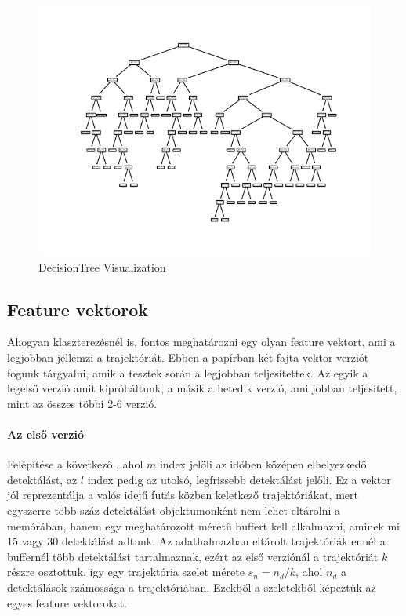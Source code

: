 \documentclass[acmtog, authorversion]{acmart}
\begin{document}
\begin{figure}
    \includegraphics[width=1\columnwidth]{visualization/bellevue_eastgate_DT_2.png}
    \caption{DecisionTree Visualization}
    \label{DTVis}
\end{figure}

\subsection{Feature vektorok}
Ahogyan klaszterezésnél is, fontos meghatározni egy olyan feature vektort, ami a legjobban jellemzi a trajektóriát. Ebben a papírban
két fajta vektor verziót fogunk tárgyalni, amik a tesztek során a legjobban teljesítettek. Az egyik a legelső verzió amit kipróbáltunk,
a másik a hetedik verzió, ami jobban teljesített, mint az összes többi 2-6 verzió. 
\paragraph{Az első verzió} Felépítése a következő \begin{math}[x_0, y_0, v_{x_0}, v_{y_0}, x_m, y_m, x_l, y_l, v_{x_l}, v_{y_l}]\end{math}, ahol \begin{math}m\end{math}
index jelöli az időben középen elhelyezkedő detektálást, az \begin{math}l\end{math} index pedig az utolsó, legfrissebb detektálást jelőli.
Ez a vektor jól reprezentálja a valós idejű futás közben keletkező trajektóriákat, mert egyszerre több száz detektálást objektumonként
nem lehet eltárolni a memórában, hanem egy meghatározott méretű buffert kell alkalmazni, aminek mi 15 vagy 30 detektálást adtunk.
Az adathalmazban eltárolt trajektóriák ennél a buffernél több detektálást tartalmaznak, ezért az első verziónál a trajektóriát \begin{math}k\end{math} 
részre osztottuk, így egy trajektória szelet mérete \begin{math}s_n = n_d/k\end{math}, ahol \begin{math}n_d\end{math} a detektálások számossága
a trajektóriában. Ezekből a szeletekből képeztük az egyes feature vektorokat.
\end{document}
